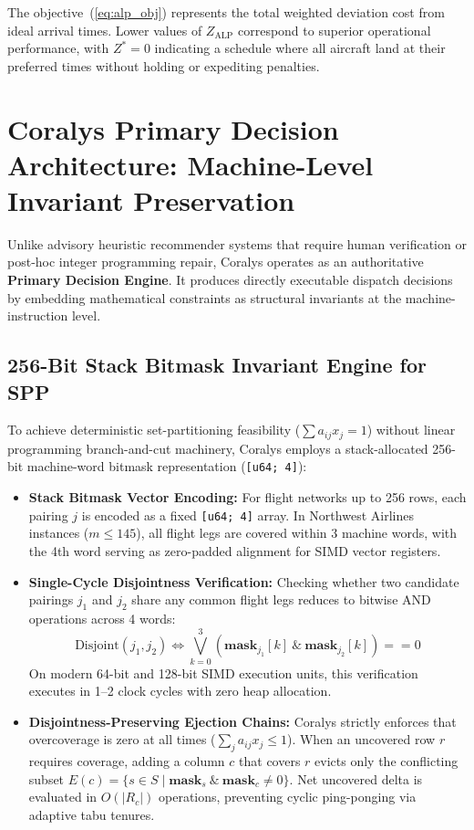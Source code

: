 \documentclass[10pt,journal,compsoc]{IEEEtran}
\begin{document}
The objective~(\ref{eq:alp_obj}) represents the total weighted deviation cost from ideal arrival times. Lower values of $Z_{\text{ALP}}$ correspond to superior operational performance, with $Z^* = 0$ indicating a schedule where all aircraft land at their preferred times without holding or expediting penalties.

\section{Coralys Primary Decision Architecture: Machine-Level Invariant Preservation}
\label{sec:architecture}

Unlike advisory heuristic recommender systems that require human verification or post-hoc integer programming repair, Coralys operates as an authoritative \textbf{Primary Decision Engine}. It produces directly executable dispatch decisions by embedding mathematical constraints as structural invariants at the machine-instruction level.

\subsection{256-Bit Stack Bitmask Invariant Engine for SPP}
To achieve deterministic set-partitioning feasibility ($\sum a_{ij} x_j = 1$) without linear programming branch-and-cut machinery, Coralys employs a stack-allocated 256-bit machine-word bitmask representation (\texttt{[u64; 4]}):
\begin{itemize}
    \item \textbf{Stack Bitmask Vector Encoding:} For flight networks up to 256 rows, each pairing $j$ is encoded as a fixed \texttt{[u64; 4]} array. In Northwest Airlines instances ($m \le 145$), all flight legs are covered within 3 machine words, with the 4th word serving as zero-padded alignment for SIMD vector registers.
    \item \textbf{Single-Cycle Disjointness Verification:} Checking whether two candidate pairings $j_1$ and $j_2$ share any common flight legs reduces to bitwise AND operations across 4 words:
    \begin{equation}
        \text{Disjoint}(j_1, j_2) \iff \bigvee_{k=0}^{3} \left( \mathbf{mask}_{j_1}[k] \ \& \ \mathbf{mask}_{j_2}[k] \right) == 0
    \end{equation}
    On modern 64-bit and 128-bit SIMD execution units, this verification executes in 1--2 clock cycles with zero heap allocation.
    \item \textbf{Disjointness-Preserving Ejection Chains:} Coralys strictly enforces that overcoverage is zero at all times ($\sum_j a_{ij} x_j \le 1$). When an uncovered row $r$ requires coverage, adding a column $c$ that covers $r$ evicts only the conflicting subset $E(c) = \{s \in S \mid \mathbf{mask}_s \ \& \ \mathbf{mask}_c \ne 0\}$. Net uncovered delta is evaluated in $O(|R_c|)$ operations, preventing cyclic ping-ponging via adaptive tabu tenures.
\end{itemize}
\end{document}
